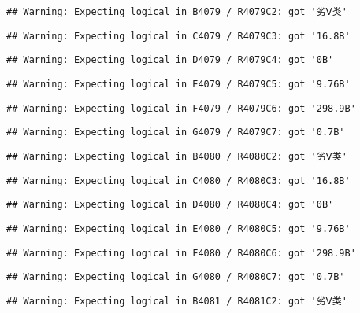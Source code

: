 \documentclass[
]{article}
\begin{document}
\begin{verbatim}
## Warning: Expecting logical in B4079 / R4079C2: got '劣Ⅴ类'
\end{verbatim}

\begin{verbatim}
## Warning: Expecting logical in C4079 / R4079C3: got '16.8B'
\end{verbatim}

\begin{verbatim}
## Warning: Expecting logical in D4079 / R4079C4: got '0B'
\end{verbatim}

\begin{verbatim}
## Warning: Expecting logical in E4079 / R4079C5: got '9.76B'
\end{verbatim}

\begin{verbatim}
## Warning: Expecting logical in F4079 / R4079C6: got '298.9B'
\end{verbatim}

\begin{verbatim}
## Warning: Expecting logical in G4079 / R4079C7: got '0.7B'
\end{verbatim}

\begin{verbatim}
## Warning: Expecting logical in B4080 / R4080C2: got '劣Ⅴ类'
\end{verbatim}

\begin{verbatim}
## Warning: Expecting logical in C4080 / R4080C3: got '16.8B'
\end{verbatim}

\begin{verbatim}
## Warning: Expecting logical in D4080 / R4080C4: got '0B'
\end{verbatim}

\begin{verbatim}
## Warning: Expecting logical in E4080 / R4080C5: got '9.76B'
\end{verbatim}

\begin{verbatim}
## Warning: Expecting logical in F4080 / R4080C6: got '298.9B'
\end{verbatim}

\begin{verbatim}
## Warning: Expecting logical in G4080 / R4080C7: got '0.7B'
\end{verbatim}

\begin{verbatim}
## Warning: Expecting logical in B4081 / R4081C2: got '劣Ⅴ类'
\end{verbatim}
\end{document}
